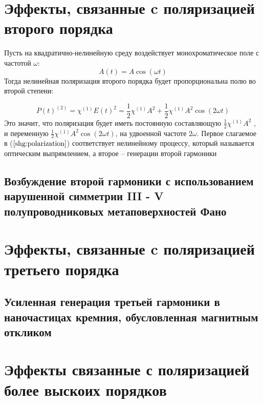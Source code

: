 \section{Эффекты, связанные c поляризацией второго порядка}
Пусть на квадратично-нелинейную среду воздействует монохроматическое поле с частотой $\omega$:
 \begin{equation}\label{shg:e(t)}
A(t) = A\cos(\omega t)
\end{equation}
Тогда нелинейная поляризация второго порядка будет пропорциональна
полю во второй степени:

 \begin{equation}\label{shg:polarization}
P(t)^{(2)} = \chi^{(1)}E(t)^2 = \frac{1}{2}\chi^{(1)}A^2 + \frac{1}{2}\chi^{(1)}A^2\cos(2\omega t)
\end{equation}
Это значит, что поляризация будет иметь постоянную составляющую $ \frac{1}{2}\chi^{(1)}A^2$ , и
переменную $\frac{1}{2}\chi^{(1)}A^2\cos(2\omega t)$, на удвоенной частоте $2\omega$. Первое слагаемое в ($\ref{shg:polarization}$) соответствует нелинейному процессу, который называется оптическим выпрямлением, а второе – генерации второй гармоники



\subsection*{Возбуждение второй гармоники с использованием нарушенной симметрии III - V полупроводниковых метаповерхностей Фано}

\section{Эффекты, связанные c поляризацией третьего порядка}

\subsection*{Усиленная генерация третьей гармоники в наночастицах кремния, обусловленная магнитным откликом}

\section{Эффекты связанные с поляризацией более выскоих порядков}


